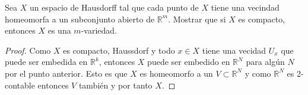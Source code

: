 
    \item Sea \( X \) un espacio de Hausdorff tal que cada punto de \( X \) tiene una vecindad homeomorfa a un subconjunto abierto de \( \mathbb{R}^m \). Mostrar que si \( X \) es compacto, entonces \( X \) es una \( m \)-variedad.


\begin{proof}

Como $X$ es compacto, Haussdorf y todo $x\in X$ tiene una vecidad $U_x$ que puede ser embedida en $\mathbb{R}^k$, entonces $X$ puede ser embedido en $\mathbb{R}^{N}$  para algún $N$ por  el punto anterior. Esto es que $X$ es homeomorfo a un $V\subset \mathbb{R}^{N}$ y como $\mathbb{R}^N$ es 2-contable entonces $V$ también y por tanto $X$. 
\end{proof}